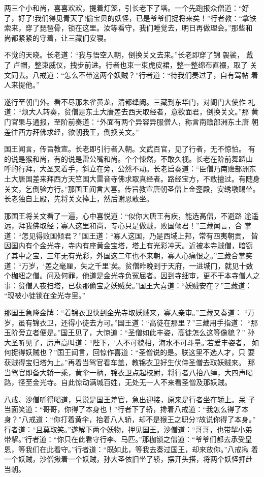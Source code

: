 两三个小和尚，喜喜欢欢，提着灯笼，引长老下了塔。一个先跑报众僧道：“好
了，好了!我们得见青天了!偷宝贝的妖怪，已是爷爷们捉将来矣！”行者教：“拿铁
索来，穿了琵琶骨，锁在这里。汝等看守，我们睡觉去，明日再做理会。”那些和
尚都紧紧的守着，让三藏们安寝。

不觉的天晓。长老道：“我与悟空入朝，倒换关文去来。”长老即穿了锦袈裟，
戴了卢帽，整束威仪，拽步前进。行者也束一束虎皮裙，整一整绵布直裰，取了
关文同去。八戒道：“怎么不带这两个妖贼？”行者道：“待我们奏过了，自有驾帖
着人来提他。”

遂行至朝门外。看不尽那朱雀黄龙，清都绛阙。三藏到东华门，对阁门大使作
礼道：“烦大人转奏，贫僧是东土大唐差去西天取经者，意欲面君，倒换关文。”那
黄门官果与通报，至阶前奏道：“外面有两个异容异服僧人，称言南赡部洲东土唐
朝差往西方拜佛求经，欲朝我王，倒换关文。”

国王闻言，传旨教宣。长老即引行者入朝。文武百官，见了行者，无不惊怕。
有的说是猴和尚，有的说是雷公嘴和尚。个个悚然，不敢久视。长老在阶前舞蹈山
呼的行拜，大圣叉着手，斜立在旁，公然不动。长老启奏道：“臣僧乃南赡部洲东
土大唐国差来拜西方天竺国大雷音寺佛求取真经者。路经宝方，不敢擅过。有随身
关文，乞倒验方行。”那国王闻言大喜。传旨教宣唐朝圣僧上金銮殿，安绣墩赐坐。
长老独自上殿，先将关文捧上，然后谢恩敢坐。

那国王将关文看了一遍，心中喜悦道：“似你大唐王有疾，能选高僧，不避路
途遥远，拜我佛取经；寡人这里和尚，专心只是做贼，败国倾君！”三藏闻言，合
掌道：“怎见得败国倾君？”国王道：“寡人这国，乃是西域上邦，常有四夷朝贡，
皆因国内有个金光寺，寺内有座黄金宝塔，塔上有光彩冲天。近被本寺贼僧，暗窃
了其中之宝，三年无有光彩，外国这二年也不来朝，寡人心痛恨之。”三藏合掌笑
道：“万岁，‘差之毫厘，失之千里’矣。贫僧昨晚到于天府，一进城门，就见十数
个枷纽之僧。问及何罪，他道是金光寺负冤屈者。因到寺细审，更不干本寺僧人之
事：贫僧入夜扫塔，已获那偷宝之妖贼矣。”国王大喜道：“妖贼安在？”三藏道：
“现被小徒锁在金光寺里。”

那国王急降金牌：“着锦衣卫快到金光寺取妖贼来，寡人亲审。”三藏又奏道：
“万岁，虽有锦衣卫，还得小徒去方可。”国王道：“高徒在那里？”三藏用手指道：
“那玉阶旁立者便是。”国王见了，大惊道：“圣僧如此丰姿，高徒怎么这等像貌？”
孙大圣听见了，厉声高叫道：“陛下，‘人不可貌相，海水不可斗量。’若爱丰姿者，
如何捉得妖贼也？”国王闻言，回惊作喜道：“圣僧说的是。朕这里不选人才，只
要获贼得宝归塔为上。”再着当驾官看车盖，教锦衣卫好生伏侍圣僧去取妖贼来。
那当驾官即备大轿一乘，黄伞一柄，锦衣卫点起校尉，将行者八抬八绰，大四声喝
路，径至金光寺。自此惊动满城百姓，无处无一人不来看圣僧及那妖贼。

八戒、沙僧听得喝道，只说是国王差官，急出迎接，原来是行者坐在轿上。呆
子当面笑道：“哥哥，你得了本身也！”行者下了轿，搀着八戒道：“我怎么得了本
身？”八戒道：“你打着黄伞，抬着八人轿，却不是猴王之职分?故说你得了本身。”
行者道：“且莫取笑。”遂解下两个妖物，押见国王。沙僧道：“哥哥，也带挈小弟
带挈。”行者道：“你只在此看守行李、马匹。”那枷锁之僧道：“爷爷们都去承受皇
恩，等我们在此看守。”行者道：“既如此，等我去奏过国王，却来放你。”八戒揪
着一个妖贼，沙僧揪着一个妖贼，孙大圣依旧坐了轿，摆开头搭，将两个妖怪押赴
当朝。

